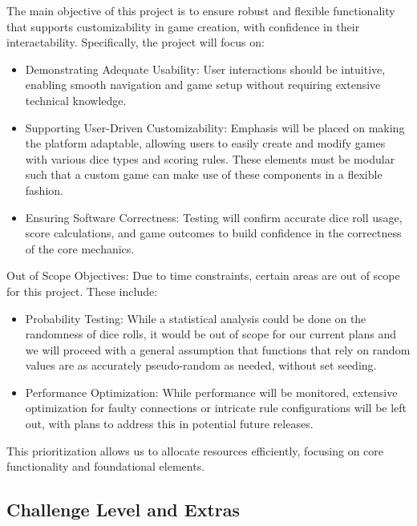 \documentclass[12pt, titlepage]{article}
\begin{document}
The main objective of this project is to ensure robust and flexible functionality that supports customizability in game creation, with confidence in their interactability. Specifically, the project will focus on:

\begin{itemize}
	\item Demonstrating Adequate Usability: User interactions should be intuitive, enabling smooth navigation and game setup without requiring extensive technical knowledge.
	\item Supporting User-Driven Customizability: Emphasis will be placed on making the platform adaptable, allowing users to easily create and modify games with various dice types and scoring rules. These elements must be modular such that a custom game can make use of these components in a flexible fashion.
	\item Ensuring Software Correctness: Testing will confirm accurate dice roll usage, score calculations, and game outcomes to build confidence in the correctness of the core mechanics.
\end{itemize}

Out of Scope Objectives: Due to time constraints, certain areas are out of scope for this project. These include:

\begin{itemize}
	\item Probability Testing: While a statistical analysis could be done on the randomness of dice rolls, it would be out of scope for our current plans and we will proceed with a general assumption that functions that rely on random values are as accurately pseudo-random as needed, without set seeding.
	\item Performance Optimization: While performance will be monitored, extensive optimization for faulty connections or intricate rule configurations will be left out, with plans to address this in potential future releases.
\end{itemize}

This prioritization allows us to allocate resources efficiently, focusing on core functionality and foundational elements.

\subsection{Challenge Level and Extras}

\iffalse
{}
\end{document}
